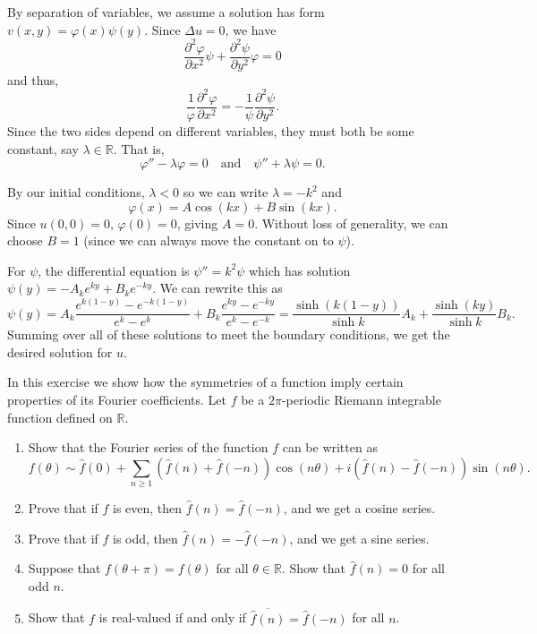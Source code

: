 \documentclass[12 pt, letterpaper]{hmcpset}
\begin{document}
\begin{solution}
	By separation of variables, we assume a solution has form $v(x, y) = \varphi(x) \psi(y)$. Since $\Delta u = 0$, we have
	\[
		\frac{\partial^{2} \varphi}{\partial x^{2}} \psi + \frac{\partial^{2} \psi}{\partial y^{2}} \varphi = 0
	\]
	and thus,
	\[
		\frac{1}{\varphi} \frac{\partial^{2} \varphi}{\partial x^{2}} = - \frac{1}{\psi} \frac{\partial^{2} \psi}{\partial y^{2}}.
	\]
	Since the two sides depend on different variables, they must both be some constant, say $\lambda \in \mathbb{R}$. That is,
	\[
		\varphi'' - \lambda \varphi = 0 \quad \text{and} \quad \psi'' + \lambda \psi = 0.
	\]

	By our initial conditions, $\lambda < 0$ so we can write $\lambda = -k^{2}$ and
	\[
		\varphi(x) = A \cos{(k x)} + B \sin{(k x)}.
	\]
	Since $u(0, 0) = 0$, $\varphi(0) = 0$, giving $A = 0$. Without loss of generality, we can choose $B = 1$ (since we can always move the constant on to $\psi$).

	For $\psi$, the differential equation is $\psi'' = k^{2} \psi$ which has solution $\psi(y) = - A_{k} e^{k y} + B_{k} e^{-k y}$. We can rewrite this as
	\[
		\psi(y) = A_{k} \frac{e^{k(1 - y)} - e^{-k(1 - y)}}{e^{k} - e^{k}} + B_{k} \frac{e^{k y} - e^{-k y}}{e^{k} - e^{-k}} =  \frac{\sinh{(k(1 - y))}}{\sinh{k}} A_{k} + \frac{\sinh{(k y)}}{\sinh{k}} B_{k}.
	\]
	Summing over all of these solutions to meet the boundary conditions, we get the desired solution for $u$.
\end{solution}

\pagebreak

\begin{problem}[S \& S \S 2.6 \#2.]
	In this exercise we show how the symmetries of a function imply certain properties of its Fourier coefficients. Let $f$ be a $2 \pi$-periodic Riemann integrable function defined on $\mathbb{R}$.
	\begin{enumerate}
		\item Show that the Fourier series of the function $f$ can be written as
			\[
				f(\theta) \sim \hat{f}(0) + \sum_{n \ge 1} (\hat{f}(n) + \hat{f}(-n)) \cos{(n \theta)} + i (\hat{f}(n) - \hat{f}(-n)) \sin{(n \theta)}.
			\]
		\item Prove that if $f$ is even, then $\hat{f}(n) = \hat{f}(-n)$, and we get a cosine series.
		\item Prove that if $f$ is odd, then $\hat{f}(n) = -\hat{f}(-n)$, and we get a sine series.
		\item Suppose that $f(\theta + \pi) = f(\theta)$ for all $\theta \in \mathbb{R}$. Show that $\hat{f}(n) = 0$ for all odd $n$.
		\item Show that $f$ is real-valued if and only if $\overline{\hat{f}(n)} = \hat{f}(-n)$ for all $n$.
	\end{enumerate}
\end{problem}
\end{document}
